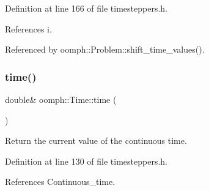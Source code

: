 Definition at line 166 of file timesteppers.\+h.



References i.



Referenced by oomph\+::\+Problem\+::shift\+\_\+time\+\_\+values().

\mbox{\label{classoomph_1_1Time_a6e28ea7a6664a2f5f5e1be871304a2c7}} 
\subsubsection{\texorpdfstring{time()}{time()}\hspace{0.1cm}{\footnotesize\ttfamily [1/2]}}
{\footnotesize\ttfamily double\& oomph\+::\+Time\+::time (\begin{DoxyParamCaption}{ }\end{DoxyParamCaption})\hspace{0.3cm}{\ttfamily [inline]}}



Return the current value of the continuous time. 



Definition at line 130 of file timesteppers.\+h.



References Continuous\+\_\+time.




